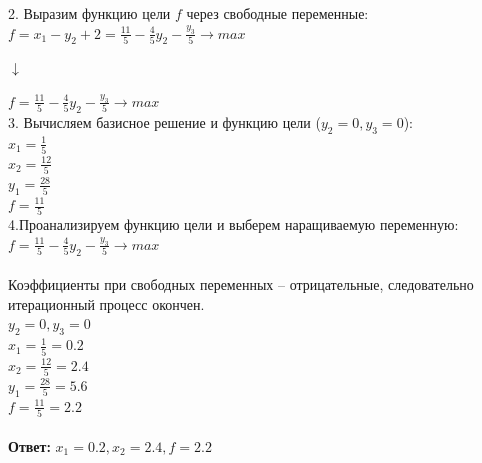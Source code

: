 \documentclass[14pt,a4paper,fleqn]{extarticle}
\begin{document}
2. Выразим функцию цели $f$ через свободные переменные:\\
$f = x_1 - y_2 + 2 = \frac{11}{5} - \frac{4}{5}y_2 - \frac{y_3}{5} \longrightarrow max$
\begin{center}$\downarrow$\end{center}
$f = \frac{11}{5} - \frac{4}{5}y_2 - \frac{y_3}{5} \longrightarrow max$\\

3. Вычисляем базисное решение и функцию цели ($y_2 = 0, y_3 = 0$):\\
$x_1 = \frac{1}{5}$\\
$x_2 = \frac{12}{5}$\\
$y_1 = \frac{28}{5}$\\
$f =  \frac{11}{5}$\\

4.Проанализируем функцию цели и выберем наращиваемую переменную:\\
$f = \frac{11}{5} - \frac{4}{5}y_2 - \frac{y_3}{5} \longrightarrow max$\\\\
Коэффициенты при свободных переменных -- отрицательные, следовательно итерационный процесс окончен.\\
$y_2 = 0, y_3 = 0$\\
$x_1 = \frac{1}{5} = 0.2$\\
$x_2 = \frac{12}{5} = 2.4$\\
$y_1 = \frac{28}{5} = 5.6$\\
$f = \frac{11}{5} = 2.2$\\\\
\textbf{Ответ:} $x_1 = 0.2, x_2 = 2.4, f = 2.2$
\end{document}
